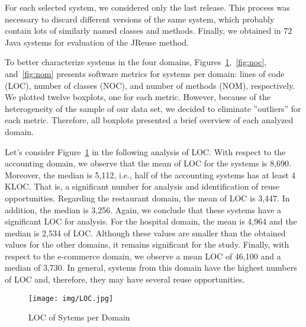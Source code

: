 For each selected system, we considered only the last release. This process was necessary to discard different versions of the same system, which probably contain lots of similarly named classes and methods. Finally, we obtained in $72$ Java systems for evaluation of the JReuse method. 

To better characterize systems in the four  domains,  Figures~\ref{fig:loc},~\ref{fig:noc}, and~\ref{fig:nom} presents software metrics for systems per domain: lines of code (LOC), number of classes (NOC), and number of methods (NOM), respectively. We plotted  twelve boxplots, one for each metric. However, because of the heterogeneity of the sample of our data set, we decided to eliminate ''outliers'' for each metric. Therefore, all boxplots presented a brief overview of each analyzed domain. %


Let's consider Figure~\ref{fig:loc} in the following analysis of LOC. With respect to the accounting domain, we observe that the mean of LOC for the systems is 8,690. Moreover, the median is 5,112, i.e., half of the accounting systems has at least 4 KLOC. That is, a significant number for analysis and identification of reuse opportunities. Regarding the restaurant domain, the mean of LOC is 3,447. In addition, the median is 3,256. Again, we conclude that these systems have a significant LOC for analysis. For the hospital domain, the mean is 4,964 and the median is 2,534 of LOC. Although these values are smaller than the obtained values for the other domains, it remains significant for the study. Finally, with respect to the e-commerce domain, we observe a mean LOC of 46,100 and a median of 3,730. In general, systems from this domain have the highest numbers of LOC and, therefore, they may have several reuse opportunities.



\begin{figure}[!h]%
\centering
\texttt{[image: img/LOC.jpg]}
\caption{LOC of Sytems per Domain}
\label{fig:loc}
\end{figure} 



